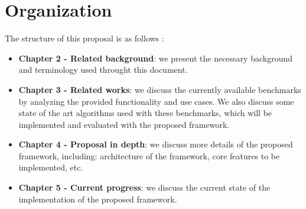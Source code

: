 \section{Organization}
\label{sec:organization}

The structure of this proposal is as follows :

\begin{itemize}
	\item \textbf{Chapter 2 - Related background}: we present the necessary background and
		  terminology used throught this document.
	\item \textbf{Chapter 3 - Related works}: we discuss the currently available benchmarks by
		  analyzing the provided functionality and use cases. We also discuss some
		  state of the art algorithms used with these benchmarks, which will be
		  implemented and evaluated with the proposed framework.
	\item \textbf{Chapter 4 - Proposal in depth}: we discuss more details of the proposed framework,
		  including: architecture of the framework, core features to be implemented, etc.
	\item \textbf{Chapter 5 - Current progress}: we discuss the current state of the implementation
		  of the proposed framework.
\end{itemize}